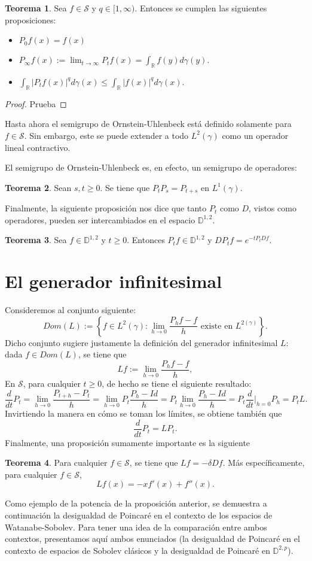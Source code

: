\documentclass[letterpaper,twoside,12pt]{book}
\newcommand{\R}{\mathbb{R}}
\newcommand{\D}{\mathbb{D}}
\renewcommand{\S}{\mathcal{S}}
\newcommand{\1}{\mathds{1}}
\newcommand{\abs}[1]{\left\lvert #1 \right\rvert}
\renewcommand{\to}{\rightarrow}
\theoremstyle{definition}
\theoremstyle{definition}
\newtheorem{teo}{Teorema}
\theoremstyle{definition}
\theoremstyle{definition}
\theoremstyle{definition}
\theoremstyle{definition}
\theoremstyle{definition}
\begin{document}
\begin{teo}
    Sea $f\in \mathcal{S}$ y $q\in [1,\infty)$. Entonces se cumplen las siguientes proposiciones:
    \begin{itemize}
        \item $P_0f(x)=f(x)$
        \item $P_\infty f(x):=\displaystyle\lim_{t\to\infty}P_tf(x)=\int_\R f(y)d\gamma(y)$.
        \item $\displaystyle\int_\R \abs{P_tf(x)}^qd\gamma(x)\leq \int_\R\abs{f(x)}^qd\gamma(x)$.
    \end{itemize}
\end{teo}
\begin{proof} 
    Prueba
 \end{proof}
Hasta ahora el semigrupo de Ornstein-Uhlenbeck está definido solamente para $f\in \mathcal{S}$. Sin embargo, este se puede extender a todo $L^2(\gamma)$ como un operador lineal contractivo.

El semigrupo de Ornstein-Uhlenbeck es, en efecto, un semigrupo de operadores:
\begin{teo} 
 Sean $s,t\geq0$. Se tiene que $P_tP_s=P_{t+s}$ en $L^1(\gamma)$.
 \end{teo}
 Finalmente, la siguiente proposición nos dice que tanto $P_t$ como $D$, vistos como operadores, pueden ser intercambiados en el espacio $\mathbb{D}^{1,2}$.
 \begin{teo} 
  Sea $f\in \D^{1,2}$ y $t\geq0$. Entonces $P_tf\in \D^{1,2}$ y $DP_tf=e^{-tP_tDf}$.
  \end{teo}

\section{El generador infinitesimal}
  Consideremos al conjunto siguiente:
  \[
  Dom(L):=\left\{f\in L^2(\gamma): \lim_{h\to 0} \frac{P_{h}f-f}{h} \text{ existe en } L^{2(\gamma)}\right\}.
  \]  
Dicho conjunto sugiere justamente la definición del generador infinitesimal $L$: dada $f\in Dom(L)$, se tiene que 
\[
Lf:=\lim_{h\to 0}\frac{P_hf-f}{h},    
\]
En $\S$, para cualquier $t\geq0$, de hecho se tiene el siguiente resultado:
\[
\frac{d}{dt}P_t=\lim_{h\to0}\frac{P_{t+h}-P_t}{h}=\lim_{h\to0}P_t\frac{P_h-Id}{h}=P_t\lim_{h\to0}\frac{P_h-Id}{h}=P_t\frac{d}{dt}\Bigg|_{h=0}P_h=P_tL.
\]
Invirtiendo la manera en cómo se toman los límites, se obtiene también que
\[
\frac{d}{dt}P_t=LP_t.    
\]
Finalmente, una proposición sumamente importante es la siguiente
\begin{teo} 
 Para cualquier $f\in \S$, se tiene que $Lf=-\delta Df$. Más específicamente, para cualquier $f\in \S$, 
 \[
 Lf(x)=-xf'(x)+f''(x).   
 \]
 \end{teo}
 Como ejemplo de la potencia de la proposición anterior, se demuestra a continuación la desigualdad de Poincaré en el contexto de los espacios de Watanabe-Sobolev.
Para tener una idea de la comparación entre ambos contextos, presentamos aquí ambos enunciados (la desigualdad de Poincaré en el contexto de espacios de Sobolev clásicos y la desigualdad de Poincaré en $\D^{2,p}$).
 
\end{document}

